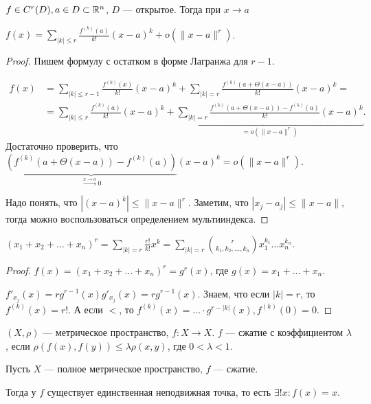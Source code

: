 \begin{theorem}
    $f \in C^r(D), a \in D \subset \mathbb{R}^n$,  $D$ --- открытое. Тогда при  $x \to a$

    $f(x) = \sum\limits_{|k| \le r} \frac{f^{(k)}(a)}{k!}(x-a)^k + o(\|x-a\|^r)$.
\end{theorem}
\begin{proof}
    Пишем формулу с остатком в форме Лагранжа для $r-1$.

    \begin{align*}
        f(x) &= \sum\limits_{|k| \le r-1} \frac{f^{(k)}(x)}{k!}(x-a)^k + \sum\limits_{|k| = r} \frac{f^{(k)}(a + \Theta(x-a))}{k!}(x-a)^k = \\ &= \sum\limits_{|k| \le r} \frac{f^{(k)}(a)}{k!}(x-a)^k + \underbracket{\sum\limits_{|k| = r} \frac{f^{(k)}(a + \Theta(x-a)) - f^{(k)}(a)}{k!}(x-a)^k}_{=o(\|x-a\|^r)}.
    \end{align*}
    Достаточно проверить, что $\underbrace{(f^{(k)}(a+\Theta(x-a)) -f^{(k)}(a))}_{\xrightarrow{x \to a} 0}(x-a)^k= o(\|x-a\|^r)$.

    Надо понять, что  $|(x-a)^k| \le \|x-a\|^r$. Заметим, что $|x_j - a_j| \le \|x-a\|$, тогда можно воспользоваться определением мультииндекса.
\end{proof}
\begin{consequence}
    $(x_1 + x_2 + \ldots + x_n)^r = \sum_{|k| = r} \frac{r!}{k!}x^k = \sum_{|k| = r} \binom{r}{k_1, k_2, \ldots, k_n} x_1^{k_1}\ldots x_n^{k_n}$.
\end{consequence}
\begin{proof}
    $f(x) = (x_1 + x_2 + \ldots + x_n)^r = g^r(x)$, где $g(x) = x_1 + \ldots + x_n$.

    $f'_{x_j}(x) = rg^{r-1}(x) g'_{x_j}(x) = r g^{r-1}(x)$. Знаем, что если $|k| = r$, то  $f^{(k)}(x) = r!$. А если  $<$, то  $f^{(k)}(x) = \ldots \cdot g^{r-|k|}(x), f^{(k)}(0) = 0$.
\end{proof}
\begin{definition}
    $(X, \rho)$ --- метрическое пространство,  $f\!: X \to X$.  $f$ --- сжатие с коэффициентом $\lambda$, если  $\rho(f(x), f(y)) \le \lambda \rho(x, y)$, где $0 < \lambda < 1$.
\end{definition}
\begin{theorem}
    Пусть $X$ --- полное метрическое пространство,  $f$ --- сжатие.

    Тогда у  $f$ существует единственная неподвижная точка, то есть  $\exists! x\!: f(x) = x$.
\end{theorem}

